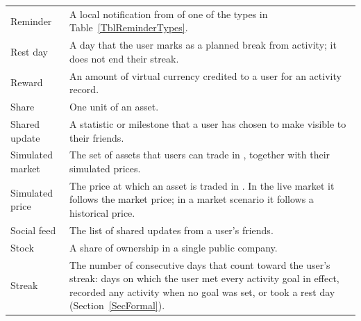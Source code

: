 \documentclass[12pt]{article}
\begin{document}
\begin{longtable}{>{\raggedright\arraybackslash}p{} p{}}
  Reminder                                           & A local notification from \progname{} of one of the types in Table~\ref{TblReminderTypes}. \\
  Rest day                                           & A day that the user marks as a planned break from activity; it does not end their streak.                                                                               \\
  Reward                                             & An amount of virtual currency credited to a user for an activity record.                                                                                                \\
  Share                                              & One unit of an asset.                                                                                                                                                   \\
  Shared update                                      & A statistic or milestone that a user has chosen to make visible to their friends.                                                                                       \\
  Simulated market                                   & The set of assets that users can trade in \progname{}, together with their simulated prices.                                                                            \\
  Simulated price                                    & The price at which an asset is traded in \progname{}. In the live market it follows the market price; in a market scenario it follows a historical price.               \\
  Social feed                                        & The list of shared updates from a user's friends.                                                                                                                       \\
  Stock                                              & A share of ownership in a single public company.                                                                                                                        \\
  Streak                                             & The number of consecutive days that count toward the user's streak: days on which the user met every activity goal in effect, recorded any activity when no goal was set, or took a rest day (Section~\ref{SecFormal}). \\

\end{longtable}
\end{document}
